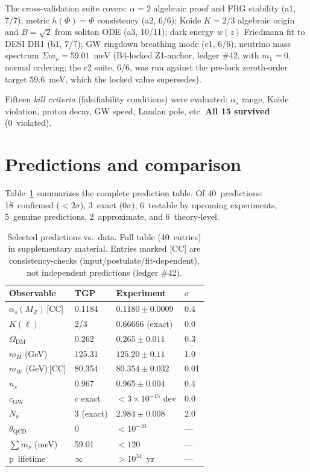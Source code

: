 \documentclass[aps,prl,twocolumn,superscriptaddress,showpacs,floatfix]{revtex4-2}
\newcommand{\as}{\alpha_s}
\begin{document}
The cross-validation suite covers: $\alpha = 2$ algebraic proof and FRG
stability (a1, 7/7); metric $h(\Phi) = \Phi$ consistency (a2, 6/6);
Koide $K = 2/3$ algebraic origin and $B = \sqrt{2}$ from soliton ODE
(a3, 10/11); dark energy $w(z)$ Friedmann fit to DESI DR1 (b1, 7/7);
GW ringdown breathing mode (c1, 6/6); neutrino mass spectrum
$\Sigma m_\nu = 59.01$~meV (B4-locked Z1-anchor, ledger \#42, with
$m_1 = 0$, normal ordering; the c2 suite, 6/6, was run against the
pre-lock zeroth-order target $59.6$~meV, which the locked value
supersedes).

Fifteen \emph{kill criteria} (falsifiability conditions) were evaluated:
$\as$ range, Koide violation, proton decay, GW speed, Landau pole, etc.
\textbf{All 15 survived} (0~violated).


\section{Predictions and comparison}

Table~\ref{tab:predictions} summarizes the complete prediction table.
Of 40~predictions: 18~confirmed ($< 2\sigma$), 3~exact ($0\sigma$),
6~testable by upcoming experiments, 5~genuine predictions,
2~approximate, and 6~theory-level.

\begin{table}[t]
\caption{Selected predictions vs.\ data.
  Full table (40~entries) in supplementary material.
  Entries marked [CC] are consistency-checks (input/postulate/fit-dependent),
  not independent predictions (ledger \#42).}
\label{tab:predictions}
\begin{ruledtabular}
\begin{tabular}{llll}
Observable & TGP & Experiment & $\sigma$ \\
\hline
$\as(M_Z)$\,[CC] & 0.1184   & $0.1180 \pm 0.0009$   & 0.4 \\
$K(\ell)$       & 2/3        & 0.66666 (exact)        & 0.0 \\
$\Omega_\mathrm{DM}$ & 0.262 & $0.265 \pm 0.011$     & 0.3 \\
$m_H$ (GeV)     & 125.31     & $125.20 \pm 0.11$      & 1.0 \\
$m_W$ (GeV)\,[CC] & 80.354   & $80.354 \pm 0.032$     & 0.01 \\
$n_s$           & 0.967      & $0.965 \pm 0.004$      & 0.4 \\
$c_\mathrm{GW}$ & $c$ exact  & $< 3\!\times\!10^{-15}$ dev & 0.0 \\
$N_\nu$         & 3 (exact)  & $2.984 \pm 0.008$       & 2.0 \\
$\theta_\mathrm{QCD}$ & 0    & $< 10^{-10}$           & --- \\
$\sum m_\nu$ (meV) & 59.01   & $< 120$                & --- \\
p~lifetime      & $\infty$   & $> 10^{34}$~yr         & --- \\
\end{tabular}
\end{ruledtabular}
\end{table}
\end{document}
